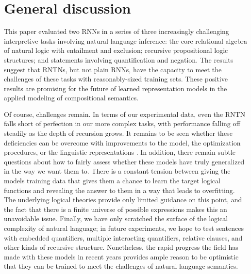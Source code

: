\section{General discussion}\label{sec:discussion}

This paper evaluated two RNNs in a series of three increasingly
challenging interpretive tasks involving natural language inference:
the core relational algebra of natural logic with entailment and
exclusion; recursive propositional logic structures; and statements
involving quantification and negation. The results suggest that RNTNs,
but not plain RNNs, have the capacity to meet the challenges of these
tasks with reasonably-sized training sets. These positive results are
promising for the future of learned representation models in the
applied modeling of compositional semantics.

Of course, challenges remain. In terms of our experimental data, even
the RNTN falls short of perfection in our more complex tasks, with
performance falling off steadily as the depth of recursion grows. It
remains to be seen whether these deficiencies can be overcome with
improvements to the model, the optimization procedures, or the
linguistic representations
\cite{sochergrounded,kalchbrenner2014convolutional}. In addition,
there remain subtle questions about how to fairly assess whether these
models have truly generalized in the way we want them to. There is a
constant tension between giving the models training data that gives
them a chance to learn the target logical functions and revealing the
answer to them in a way that leads to overfitting. The underlying
logical theories provide only limited guidance on this point, and the fact that 
there is a finite universe of possible expressions makes this an unavoidable issue. 
Finally, we have only scratched the surface of the logical complexity of
natural language; in future experiments, we hope to test sentences
with embedded quantifiers, multiple interacting quantifiers, relative
clauses, and other kinds of recursive structure. Nonetheless, the
rapid progress the field has made with these models in recent years
provides ample reason to be optimistic that they can be trained to
meet the challenges of natural language semantics.


